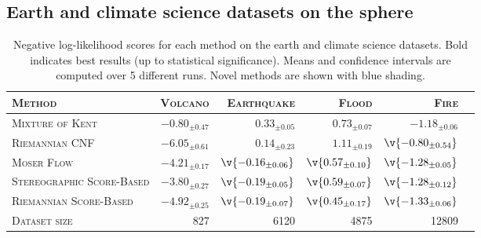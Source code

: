 \subsection{Earth and climate science datasets on the sphere}
\label{sec:exp_sphere}
\begin{table}[t]
	\centering
	\small
	\begin{tabular}{lrrrrr}
		\toprule
		\scshape Method                    & \scshape {Volcano}                               & \scshape {Earthquake}                              & \scshape {Flood}                                  & \scshape {Fire}                                    \\
		\midrule
		\scshape Mixture of Kent           & $-0.80_{\pm 0.47}$                      & $0.33_{\pm 0.05}$                         & $0.73_{\pm 0.07}$                        & $-1.18_{\pm 0.06}$                        \\
		\scshape Riemannian CNF            & $\bm{-6.05_{\pm 0.61}}$                  & ${0.14_{\pm 0.23}}$                       & ${1.11_{\pm 0.19}}$                      & $\v{-0.80_{\pm 0.54}}$                    \\
		\scshape Moser Flow                & ${-4.21_{\pm 0.17}}$                    & $\v{-0.16_{\pm 0.06}}$                    & $\v{0.57_{\pm 0.10}}$                    & $\v{-1.28_{\pm 0.05}}$                    \\
		\rowcolor{pearDark!20} \scshape Stereographic Score-Based & ${-3.80_{\pm 0.27}}$ & $\v{-0.19_{\pm 0.05}}$ & $\v{0.59_{\pm 0.07}}$ & $\v{-1.28_{\pm 0.12}}$ \\
		\rowcolor{pearDark!20} \scshape Riemannian Score-Based    & ${-4.92_{\pm 0.25}}$ & $\v{-0.19_{\pm 0.07}}$ & $\v{0.45_{\pm 0.17}}$ & $\v{-1.33_{\pm 0.06}}$ \\
		\midrule
		\scshape Dataset size              & 827                                     & 6120                                      & 4875                                     & 12809                                     \\
		\bottomrule
	\end{tabular}
	\caption{
		Negative log-likelihood scores for each method on the earth and climate science datasets.
		Bold indicates best results (up to statistical significance).
		Means and confidence intervals are computed over 5 different runs.
		Novel methods are shown with blue shading.
	}
	\label{tab:geoscience}
\end{table}

